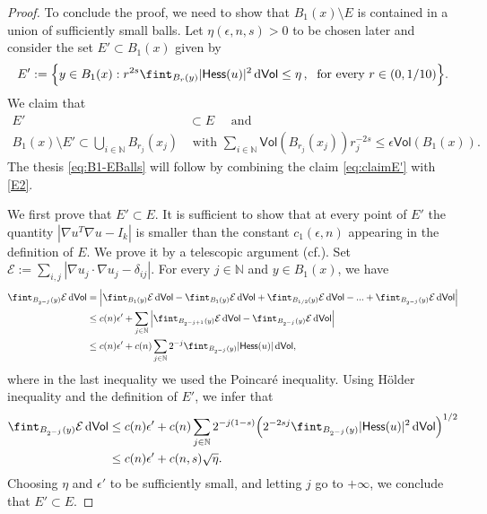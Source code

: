 \documentclass[10pt]{article}
\theoremstyle{definition}
\newcommand{\bb}[1]{\mathbb{#1}}
\newcommand{\ssf}[1]{\mathsf{#1}}
\newcommand{\Hess}{\mathsf{Hess}}
\newcommand{\de}{{\rm d}}
\begin{document}
\begin{proof}
            To conclude the proof, we need to show that $B_1(x) \setminus E$ is contained in a union of sufficiently small balls. Let $\eta(\epsilon,n,s)>0$ to be chosen later and consider the set $E' \subset B_1(x)$ given by
            \[
            E':=\Big\{y \in B_1(x): r^{2s} \fint_{B_r(y)} |\Hess(u)|^2 \,\de\ssf{Vol} \leq \eta\, , \; \text{ for every } r \in (0,1/10) \Big\}.
            \]
            We claim that
            \begin{equation}\label{eq:claimE'}
            \begin{split}
             E' &\subset E \quad\text{ and} \\
            B_1(x) \setminus E' \subset \bigcup_{i \in \bb{N}} B_{r_j}(x_j) &\text{ with } 
        \sum_{i \in \bb{N}} \ssf{Vol}(B_{r_j}(x_j)) r_j^{-2s} \leq \epsilon \ssf{Vol}(B_1(x)).
        \end{split}
            \end{equation}
            The thesis \eqref{eq:B1-EBalls} will follow by combining the claim \eqref{eq:claimE'} with  \eqref{E2}.
            \par 
            We first prove that $E' \subset E$. It is sufficient to show that at every point of $E'$ the quantity $|\nabla u^T  \nabla u-I_k|$ is smaller than the constant $c_1(\epsilon,n)$ appearing in the definition of $E$. We prove it by a telescopic argument (cf.\;\cite{MonBruSem}).
            Set $\mathcal{E}:=\sum_{i,j}| \nabla u_j \cdot \nabla u_j-\delta_{ij}| $.
            For every $j \in \bb{N}$ and $y \in B_1(x)$, we have
            \begin{align*}
            \fint_{B_{2^{-j}}(y)} \mathcal{E} \,\de\ssf{Vol}
            & = \Big| \fint_{B_1(y)} \mathcal{E} \,\de\ssf{Vol}
            -\fint_{B_1(y)} \mathcal{E} \,\de\ssf{Vol}
            +
            \fint_{B_{1/2}(y)} \mathcal{E} \,\de\ssf{Vol}
            - ...
            + \fint_{B_{2^{-j}}(y)} \mathcal{E} \,\de\ssf{Vol} \Big|
            \\
            & \leq c(n)\epsilon' + \sum_{j \in \bb{N}} \Big|
            \fint_{B_{2^{-j+1}}(y)} \mathcal{E} \,\de\ssf{Vol}
            - \fint_{B_{2^{-j}}(y)} \mathcal{E} \,\de\ssf{Vol}
            \Big|
            \\
            & \leq c(n) \epsilon' + c(n) \sum_{j \in \bb{N}} 2^{-j}  \fint_{B_{2^{-j}}(y)} |\Hess(u)| \,\de\ssf{Vol},
            \end{align*}
            where in the last inequality we used the Poincar\'e inequality.
            Using Hölder inequality  and the definition of $E'$, we infer that
            \begin{align*}
            \fint_{B_{2^{-j}}(y)} \mathcal{E} \,\de\ssf{Vol} & \leq
            c(n) \epsilon' + c(n) \sum_{j \in \bb{N}} 2^{-j(1-s)} 
            \Big( 2^{-2sj} \fint_{B_{2^{-j}}(y)} |\Hess(u)|^2 \,\de\ssf{Vol} \Big)^{1/2} \\ 
            & \leq c(n) \epsilon' + c(n,s) \sqrt{\eta}.
            \end{align*}
            Choosing $\eta$ and $\epsilon'$ to be sufficiently small, and letting $j$ go to $+ \infty$, we conclude that $E' \subset E$.
            

\end{proof}
\end{document}
